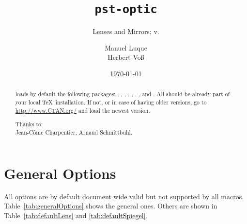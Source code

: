 \documentclass[11pt,english,BCOR10mm,DIV13,bibliography=totoc,parskip=false,smallheadings
    headexclude,footexclude,oneside]{pst-doc}
\let\pstOpticFV\fileversion
\begin{document}
\title{\texttt{pst-optic}}
\subtitle{Lenses and Mirrors; v.\pstOpticFV}

\author{Manuel Luque \\Herbert Vo\ss}
\date{\today}
\maketitle

\tableofcontents

\clearpage

\begin{abstract}
\noindent
{} loads by default the following packages: 
, , , ,
, , , and .
All should be already part of your local \TeX\ installation. If not, or in case
of having older versions, go to \url{http://www.CTAN.org/} and load the newest version.

\vfill\noindent
Thanks to: \\
Jean-C\^ome Charpentier, 
Arnaud Schmittbuhl.
\end{abstract}

\section{General Options}

All options are by default document wide valid but not supported by all macros. 
Table~\ref{tab:generalOptions} shows the general ones. Others are shown in 
Table~\ref{tab:defaultLens} and \ref{tab:defaultSpiegel}.
\end{document}
